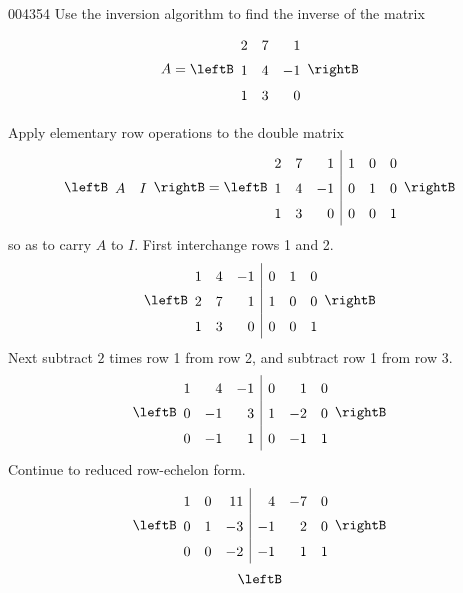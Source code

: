 \begin{example}{}{004354}
Use the inversion algorithm to find the inverse of the matrix
\begin{equation*}
A = \leftB \begin{array}{rrr}
2 & 7 & 1 \\
1 & 4 & -1 \\
1 & 3 & 0
\end{array} \rightB
\end{equation*}
\begin{solution}
  Apply elementary row operations to the double matrix
\begin{equation*}
\leftB \begin{array}{rrr}
A & I
\end{array} \rightB = \leftB \begin{array}{rrr|rrr}
2 & 7 & 1 & 1 & 0 & 0 \\
1 & 4 & -1 & 0 & 1 & 0 \\
1 & 3 & 0 & 0 & 0 & 1
\end{array} \rightB
\end{equation*}
so as to carry $A$ to $I$. First interchange rows 1 and 2.
\begin{equation*}
\leftB \begin{array}{rrr|rrr}
1 & 4 & -1 & 0 & 1 & 0 \\
2 & 7 & 1 & 1 & 0 & 0 \\
1 & 3 & 0 & 0 & 0 & 1
\end{array} \rightB
\end{equation*}
Next subtract $2$ times row 1 from row 2, and subtract row 1 from row 3.
\begin{equation*}
\leftB \begin{array}{rrr|rrr}
1 & 4 & -1 & 0 & 1 & 0 \\
0 & -1 & 3 & 1 & -2 & 0 \\
0 & -1 & 1 & 0 & -1 & 1
\end{array} \rightB
\end{equation*}
Continue to reduced row-echelon form.
\begin{equation*}
\leftB \begin{array}{rrr|rrr}
1 & 0 & 11 & 4 & -7 & 0 \\
0 & 1 & -3 & -1 & 2 & 0 \\
0 & 0 & -2 & -1 & 1 & 1
\end{array} \rightB
\end{equation*}
\begin{equation*}
\leftB \def\arraystretch{1.5} \begin{array}{rrr|rrr}

\end{array}
\end{equation*}
\end{solution}
\end{example}
